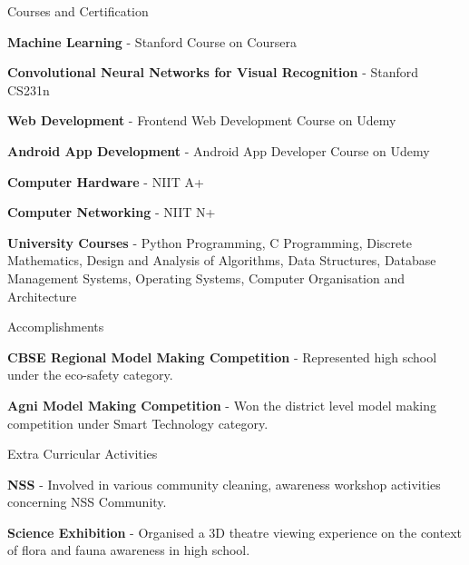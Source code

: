 \documentclass{resume} %
\begin{document}

\begin{rSection}{Courses and Certification}

\item{\textbf{Machine Learning}} - Stanford Course on Coursera 
\item{\textbf{Convolutional Neural Networks for Visual Recognition}} - Stanford CS231n
\item{\textbf{Web Development}} - Frontend Web Development Course on Udemy
\item{\textbf{Android App Development}} - Android App Developer Course on Udemy
\item{\textbf{Computer Hardware}} - NIIT A+
\item{\textbf{Computer Networking}} - NIIT N+
\item{\textbf{University Courses}} - Python Programming, C Programming, Discrete Mathematics, Design and Analysis of Algorithms, Data Structures, Database Management Systems, Operating Systems, Computer Organisation and Architecture

\end{rSection}

\begin{rSection}{Accomplishments}

\item{\textbf{CBSE Regional Model Making Competition}} - Represented high school under the eco-safety category.
\item{\textbf{Agni Model Making Competition}} - Won the district level model making competition under Smart Technology category. 



\end{rSection}

\begin{rSection}{Extra Curricular Activities}

\item{\textbf{NSS}} - Involved in various community cleaning, awareness workshop activities concerning NSS Community.

\item{\textbf{Science Exhibition}} - Organised a 3D theatre viewing experience on the context of flora and fauna awareness in high school.  

\end{rSection}
\end{document}
